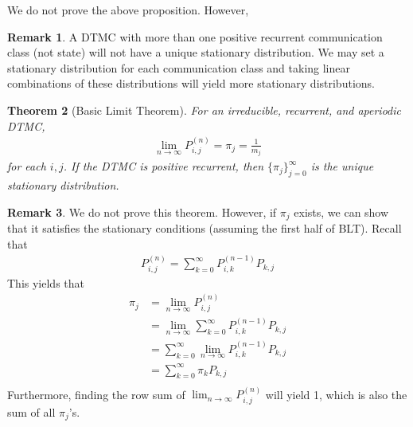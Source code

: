 \documentclass[11pt]{amsart}
\newtheorem{theorem}{Theorem}[section]
\theoremstyle{definition}
\newtheorem{remark}[theorem]{Remark}
\numberwithin{equation}{section}
\begin{document}
 We do not prove the above proposition. However, 
 \begin{remark}
     A DTMC with more than one positive recurrent communication class (not state) will not have a unique stationary distribution. We may set a stationary distribution for each communication class and taking linear combinations of these distributions will yield more stationary distributions.
 \end{remark}
 \begin{theorem}[Basic Limit Theorem]
     For an irreducible, recurrent, and aperiodic DTMC,
     \begin{align*}
         \lim_{n\to\infty}P_{i,j}^{(n)}=\pi_j=\frac{1}{m_j}
     \end{align*}
     for each $i,j$. If the DTMC is positive recurrent, then $\{\pi_j\}_{j=0}^\infty$ is the unique stationary distribution.
 \end{theorem}
 \begin{remark}
     We do not prove this theorem. However, if $\pi_j$ exists, we can show that it satisfies the stationary conditions (assuming the first half of BLT). Recall that
     \begin{align*}
         P_{i,j}^{(n)}=\sum_{k=0}^\infty P_{i,k}^{(n-1)}P_{k,j}
     \end{align*}
     This yields that
     \begin{align*}
         \pi_j&=\lim_{n\to\infty}P_{i,j}^{(n)}\\
         &=\lim_{n\to\infty}\sum_{k=0}^\infty P_{i,k}^{(n-1)}P_{k,j}\\
         &=\sum_{k=0}^\infty\lim_{n\to\infty} P_{i,k}^{(n-1)}P_{k,j}\\
         &=\sum_{k=0}^\infty \pi_kP_{k,j}\\
     \end{align*}
     Furthermore, finding the row sum of $\lim_{n\to\infty}P_{i,j}^{(n)}$ will yield 1, which is also the sum of all $\pi_j$'s.
 \end{remark}
\end{document}
